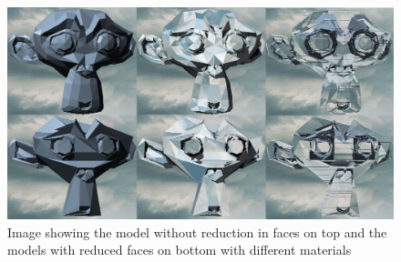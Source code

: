 \documentclass[final]{cmpreport}
\begin{document}
\begin{figure}
    \centering
    \includegraphics[width=\textwidth]{img/model_reduced.png}
    \caption{Image showing the model without reduction in faces on top and the models with reduced faces on bottom with different materials}
    \label{modelreduced}
\end{figure}
\end{document}
